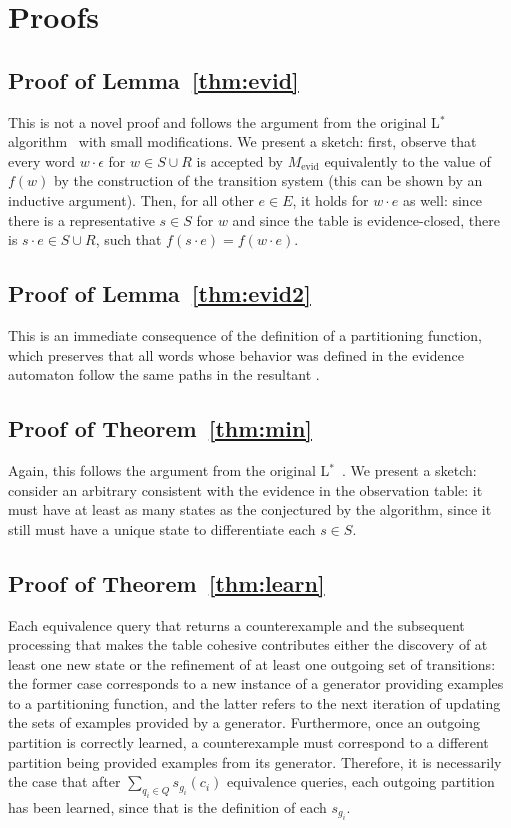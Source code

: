 \section{Proofs}

\subsection*{Proof of Lemma~\ref{thm:evid}}
This is not a novel proof and follows the
argument from the original L$^*$ algorithm~\cite{angluin87}
with small modifications.
We present a sketch:
first, observe that every word $w \cdot \epsilon$ for $w \in S \cup R$
is accepted by $M_\text{evid}$ equivalently to the value of $f(w)$
by the construction of the transition system
(this can be shown by an inductive argument).
Then, for all other $e \in E$,
it holds for $w \cdot e$ as well:
since there is a representative $s \in S$ for $w$
and since the table is evidence-closed,
there is $s \cdot e \in S \cup R$,
such that $f(s \cdot e) = f(w \cdot e)$.

\subsection*{Proof of Lemma~\ref{thm:evid2}}
This is an immediate consequence of the definition of a partitioning function, which
preserves that all words whose behavior was defined in the evidence automaton
follow the same paths in the resultant \SFA.

\subsection*{Proof of Theorem~\ref{thm:min}}
Again, this follows the argument from
the original L$^*$~\cite{angluin87}.
We present a sketch:
consider an arbitrary \SFA consistent with the evidence
in the observation table:
it must have at least as many states as the \SFA
conjectured by the algorithm, since it still must
have a unique state to differentiate each $s \in S$.

\subsection*{Proof of Theorem~\ref{thm:learn}}
Each equivalence query that returns a counterexample
and the subsequent processing that makes the table cohesive
contributes either \rone the discovery of at least one new state
or \rtwo the refinement of at least one outgoing set of transitions:
the former case corresponds to a new instance of a
generator providing examples to a partitioning function,
and the latter refers to the next iteration of
updating the sets of examples provided by a generator.
Furthermore, once an outgoing partition is correctly learned,
a counterexample must correspond to a different
partition being provided examples from its generator.
Therefore, it is necessarily the case that after
$\sum_{q_i \in Q} s_{g_i}(c_i)$ equivalence queries,
each outgoing partition has been learned,
since that is the definition of each $s_{g_i}$.

